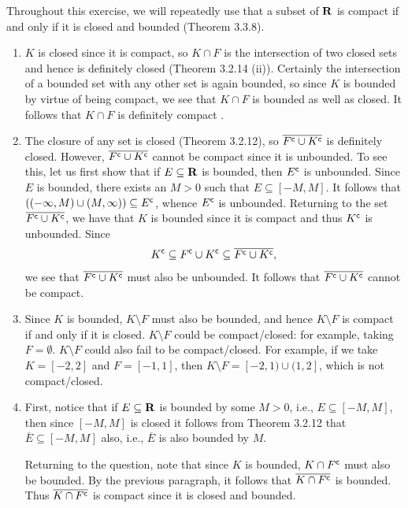 \documentclass{lew98_solutions}
\begin{document}
\begin{solution}
    Throughout this exercise, we will repeatedly use that a subset of \( \mathbf{R} \) is compact if and only if it is closed and bounded (Theorem 3.3.8).
    \begin{enumerate}
        \item \( K \) is closed since it is compact, so \( K \cap F \) is the intersection of two closed sets and hence is definitely closed (Theorem 3.2.14 (ii)). Certainly the intersection of a bounded set with any other set is again bounded, so since \( K \) is bounded by virtue of being compact, we see that \( K \cap F \) is bounded as well as closed. It follows that \( K \cap F \) is definitely compact .

        \item The closure of any set is closed (Theorem 3.2.12), so \( \overline{F^{\mathsf{c}} \cup K^{\mathsf{c}}} \) is definitely closed. However, \( \overline{F^{\mathsf{c}} \cup K^{\mathsf{c}}} \) cannot be compact since it is unbounded. To see this, let us first show that if \( E \subseteq \mathbf{R} \) is bounded, then \( E^{\mathsf{c}} \) is unbounded. Since \( E \) is bounded, there exists an \( M > 0 \) such that \( E \subseteq [-M, M] \). It follows that \( ((-\infty, M) \cup (M, \infty)) \subseteq E^{\mathsf{c}} \), whence \( E^{\mathsf{c}} \) is unbounded. Returning to the set \( \overline{F^{\mathsf{c}} \cup K^{\mathsf{c}}} \), we have that \( K \) is bounded since it is compact and thus \( K^{\mathsf{c}} \) is unbounded. Since
        \[
            K^{\mathsf{c}} \subseteq F^{\mathsf{c}} \cup K^{\mathsf{c}} \subseteq \overline{F^{\mathsf{c}} \cup K^{\mathsf{c}}},
        \]
        we see that \( \overline{F^{\mathsf{c}} \cup K^{\mathsf{c}}} \) must also be unbounded. It follows that \( \overline{F^{\mathsf{c}} \cup K^{\mathsf{c}}} \) cannot be compact.

        \item Since \( K \) is bounded, \( K \setminus F \) must also be bounded, and hence \( K \setminus F \) is compact if and only if it is closed. \( K \setminus F \) could be compact/closed: for example, taking \( F = \emptyset \). \( K \setminus F \) could also fail to be compact/closed. For example, if we take \( K = [-2, 2] \) and \( F = [-1, 1] \), then \( K \setminus F = [-2, 1) \cup (1, 2] \), which is not compact/closed.

        \item First, notice that if \( E \subseteq \mathbf{R} \) is bounded by some \( M > 0 \), i.e., \( E \subseteq [-M, M] \), then since \( [-M, M] \) is closed it follows from Theorem 3.2.12 that \( \overline{E} \subseteq [-M, M] \) also, i.e., \( \overline{E} \) is also bounded by \( M \).

        Returning to the question, note that since \( K \) is bounded, \( K \cap F^{\mathsf{c}} \) must also be bounded. By the previous paragraph, it follows that \( \overline{K \cap F^{\mathsf{c}}} \) is bounded. Thus \( \overline{K \cap F^{\mathsf{c}}} \) is compact since it is closed and bounded.
    \end{enumerate}
\end{solution}
\end{document}
